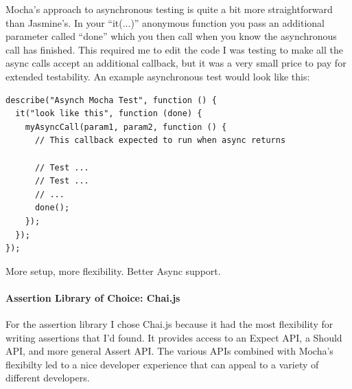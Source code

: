 \documentclass[11pt]{article}
\begin{document}
Mocha's approach to asynchronous testing is quite a bit more straightforward than Jasmine's. In your ``it(...)'' anonymous function you pass an additional parameter called ``done'' which you then call when you know the asynchronous call has finished. This required me to edit the code I was testing to make all the async calls accept an additional callback, but it was a very small price to pay for extended testability. An example asynchronous test would look like this:
\begin{lstlisting}
describe("Asynch Mocha Test", function () {
  it("look like this", function (done) {
    myAsyncCall(param1, param2, function () {
      // This callback expected to run when async returns

      // Test ...
      // Test ...
      // ...
      done();
    });
  });
});
\end{lstlisting}

More setup, more flexibility.
Better Async support.

\paragraph{Assertion Library of Choice: Chai.js \cite{Chaijs}}
For the assertion library I chose Chai.js because it had the most flexibility for writing assertions that I'd found. It provides access to an Expect API, a Should API, and more general Assert API. The various APIs combined with Mocha's flexibilty led to a nice developer experience that can appeal to a variety of different developers.
\end{document}
